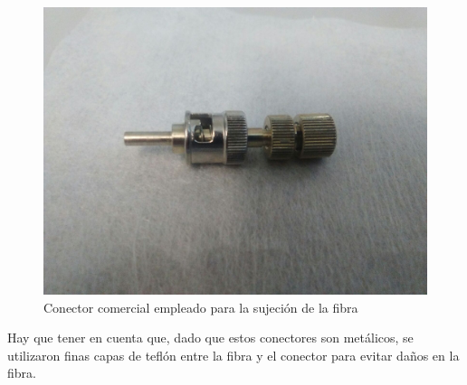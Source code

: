 \begin{itemize}
\begin{figure}[H]
\centering
\includegraphics[scale=0.1]{Figuras/conector.jpeg}
\caption{Conector comercial empleado para la sujeción de la fibra\label{conector}}
\end{figure}

Hay que tener en cuenta que, dado que estos conectores son metálicos, se utilizaron finas capas de teflón entre la fibra y el conector para evitar daños en la fibra.




\end{itemize}
